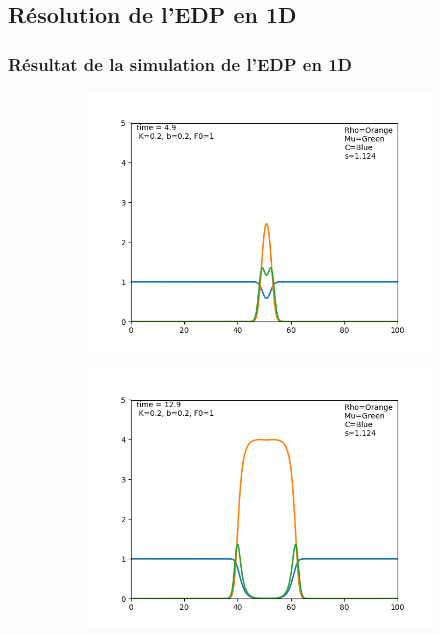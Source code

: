 \documentclass[11pt]{article}
\begin{document}
\newpage
\subsection{Résolution de l'EDP en 1D}
\subsubsection{Résultat de la simulation de l'EDP en 1D}
\begin{figure}[hbt!]
\centering
\begin{subfigure}[b]{0.45\textwidth}
\includegraphics[width=\textwidth]{Images/edp_1d_0.png}
\end{subfigure}
\begin{subfigure}[b]{0.45\textwidth}
\includegraphics[width=\textwidth]{Images/edp_1d_1.png}

\end{subfigure}
\end{figure}
\end{document}
